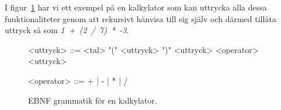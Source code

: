 I figur~\ref{fig:cfg} har vi ett exempel på en kalkylator som kan uttrycka
alla dessa funktionaliteter genom att rekursivt hänvisa till sig själv och
därmed tillåta uttryck så som \mbox{\textit{1 + (2 / 7) * -3}}.

\begin{figure}[ht]
  \begin{grammar}
    \singlespace\small%
    \selectfont

    <uttryck> ::= <tal>
      \alt "(" <uttryck> ")"
      \alt <uttryck> <operator> <uttryck>

    <operator> ::= + | - | * | /

  \end{grammar}
  \caption{EBNF grammatik för en kalkylator.}
  \label{fig:cfg}
\end{figure}

